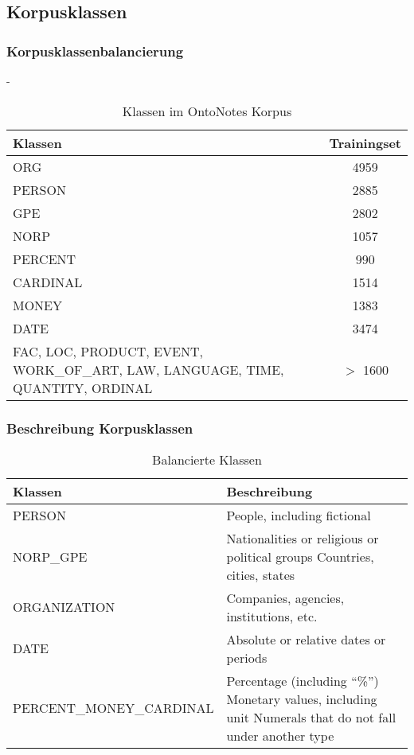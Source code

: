 \documentclass{beamer}
\begin{document}
	\subsection{Korpusklassen}
		\begin{frame}
			\frametitle{Korpusklassenbalancierung}
			-	\begin{table}
				\caption{Klassen im OntoNotes Korpus}
				\begin{tabularx}{\textwidth}{Xc}
					\toprule
					Klassen  & Trainingset \\
					\midrule
					ORG  & 4959 \\
					PERSON & 2885 \\
					GPE & 2802 \\
					NORP & 1057 \\
					PERCENT & 990  \\
					CARDINAL & 1514 \\
					MONEY & 1383  \\
					DATE & 3474  \\
					FAC, LOC, PRODUCT, EVENT, WORK\_OF\_ART, LAW, LANGUAGE, TIME, QUANTITY, ORDINAL & $>$ 1600 \\
					\bottomrule
				\end{tabularx}
				\label{tab:datasets}
			\end{table}
		\end{frame}
	\begin{frame}
		\frametitle{Beschreibung Korpusklassen}
		\begin{table}
			\caption{Balancierte Klassen}
			\begin{tabularx}{\textwidth}{lX}
				\toprule
				Klassen  & Beschreibung \\
				\midrule
				PERSON 	& People, including fictional \\
				NORP\_GPE &	Nationalities or religious or political groups
				Countries, cities, states\\
				ORGANIZATION &	Companies, agencies, institutions, etc.\\
				DATE &	Absolute or relative dates or periods\\
				PERCENT\_MONEY\_CARDINAL &	Percentage (including “\%”)
				Monetary values, including unit
				Numerals that do not fall under another type \\
				\bottomrule
			\end{tabularx}
			\label{tab:datasets}
		\end{table}
	\end{frame}
	
\end{document}
